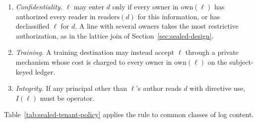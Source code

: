 \begin{enumerate}[leftmargin=1.6em,itemsep=2pt]
\item \emph{Confidentiality.} $\ell$ may enter $d$ only if every owner in
  $\mathrm{own}(\ell)$ has authorized every reader in $\mathrm{readers}(d)$ for this information, or has
  declassified $\ell$ for $d$. A line with several owners takes the most
  restrictive authorization, as in the lattice join of
  Section~\ref{sec:sealed-design}.
\item \emph{Training.} A training destination may instead accept $\ell$ through
  a private mechanism whose cost is charged to every owner in $\mathrm{own}(\ell)$ on the
  subject-keyed ledger.
\item \emph{Integrity.} If any principal other than $\ell$'s author reads $d$
  with directive use, $I(\ell)$ must be operator.
\end{enumerate}

Table~\ref{tab:sealed-tenant-policy} applies the rule to common classes of log
content.

\ifdefined\pdbookfontprofile
\fi

